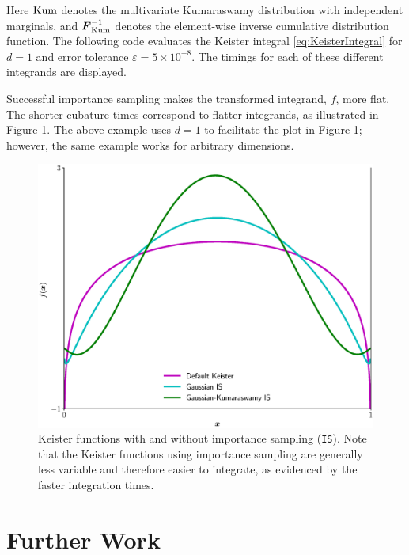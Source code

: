\documentclass[graybox]{svmult}
\begin{document}
Here $\textup{Kum}$ denotes the multivariate Kumaraswamy distribution with independent marginals, and $ \boldsymbol{F}^{-1}_{\textup{Kum}}$ denotes the element-wise inverse cumulative distribution function.  The following code evaluates the Keister integral \eqref{eq:KeisterIntegral} for $d=1$ and error tolerance $\varepsilon = 5 \times 10^{-8}$.  The timings for each of these different integrands are displayed.



Successful importance sampling makes the transformed integrand, $f$, more flat. The shorter cubature times correspond to flatter integrands, as  illustrated in Figure \ref{fig:mIS}. The above example uses $d=1$ to facilitate the plot in Figure \ref{fig:mIS}; however, the same example works for arbitrary dimensions.
\begin{figure}[t]
    \centering
	\includegraphics[width=.8\textwidth]{QMCSoftwareArticle/vfigs/multiple_IS.eps}
	\caption{Keister functions with and without importance sampling (\texttt{IS}). Note that the Keister functions using importance sampling are generally less variable and therefore easier to integrate, as evidenced by the faster integration times.} \label{fig:mIS}
\end{figure}



\section{Further Work} \label{sec:further}
\end{document}
